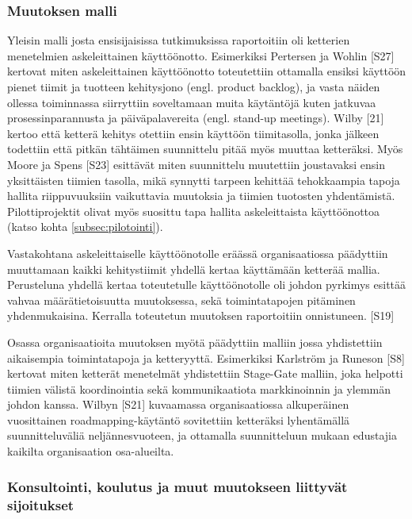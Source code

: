 \subsubsection{Muutoksen malli}

Yleisin malli josta ensisijaisissa tutkimuksissa raportoitiin oli ketterien
menetelmien askeleittainen käyttöönotto. Esimerkiksi Pertersen ja Wohlin [S27]
kertovat miten askeleittainen käyttöönotto toteutettiin ottamalla ensiksi
käyttöön pienet tiimit ja tuotteen kehitysjono (engl. product backlog), ja vasta
näiden ollessa toiminnassa siirryttiin soveltamaan muita käytäntöjä kuten
jatkuvaa prosessinparannusta ja päiväpalavereita (engl. stand-up meetings).
Wilby [21] kertoo että ketterä kehitys otettiin ensin käyttöön tiimitasolla,
jonka jälkeen todettiin että pitkän tähtäimen suunnittelu pitää myös muuttaa
ketteräksi. Myös Moore ja Spens [S23] esittävät miten suunnittelu muutettiin
joustavaksi ensin yksittäisten tiimien tasolla, mikä synnytti tarpeen kehittää
tehokkaampia tapoja hallita riippuvuuksiin vaikuttavia muutoksia ja tiimien
tuotosten yhdentämistä. Pilottiprojektit olivat myös suosittu tapa hallita
askeleittaista käyttöönottoa (katso kohta \ref{subsec:pilotointi}).

Vastakohtana askeleittaiselle käyttöönotolle eräässä organisaatiossa päädyttiin
muuttamaan kaikki kehitystiimit yhdellä kertaa käyttämään ketterää mallia.
Perusteluna yhdellä kertaa toteutetulle käyttöönotolle oli johdon pyrkimys
esittää vahvaa määrätietoisuutta muutoksessa, sekä toimintatapojen pitäminen
yhdenmukaisina. Kerralla toteutetun muutoksen raportoitiin onnistuneen. [S19]

Osassa organisaatioita muutoksen myötä päädyttiin malliin jossa yhdistettiin
aikaisempia toimintatapoja ja ketteryyttä. Esimerkiksi Karlström ja Runeson [S8]
kertovat miten ketterät menetelmät yhdistettiin Stage-Gate malliin, joka
helpotti tiimien välistä koordinointia sekä kommunikaatiota markkinoinnin ja
ylemmän johdon kanssa. Wilbyn [S21] kuvaamassa organisaatiossa alkuperäinen
vuosittainen roadmapping-käytäntö sovitettiin ketteräksi lyhentämällä
suunnitteluväliä neljännesvuoteen, ja ottamalla suunnitteluun mukaan edustajia
kaikilta organisaation osa-alueilta.

\subsubsection{Konsultointi, koulutus ja muut muutokseen liittyvät sijoitukset}
\label{sec:investments}

